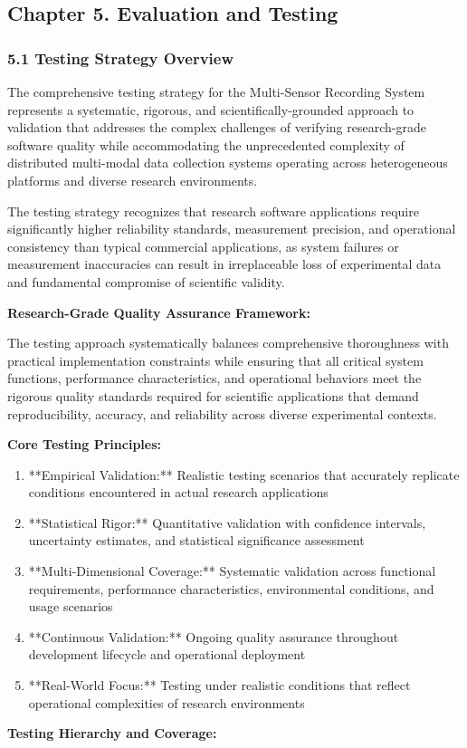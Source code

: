 \documentclass[12pt,a4paper]{report}
\begin{document}
\subsection{Chapter 5. Evaluation and Testing}

\subsubsection{5.1 Testing Strategy Overview}

The comprehensive testing strategy for the Multi-Sensor Recording System represents a systematic, rigorous, and
scientifically-grounded approach to validation that addresses the complex challenges of verifying research-grade
software quality while accommodating the unprecedented complexity of distributed multi-modal data collection systems
operating across heterogeneous platforms and diverse research environments.

The testing strategy recognizes that research software applications require significantly higher reliability standards,
measurement precision, and operational consistency than typical commercial applications, as system failures or
measurement inaccuracies can result in irreplaceable loss of experimental data and fundamental compromise of scientific
validity.

\textbf{Research-Grade Quality Assurance Framework:}

The testing approach systematically balances comprehensive thoroughness with practical implementation constraints while
ensuring that all critical system functions, performance characteristics, and operational behaviors meet the rigorous
quality standards required for scientific applications that demand reproducibility, accuracy, and reliability across
diverse experimental contexts.

\textbf{Core Testing Principles:}

\begin{enumerate}
\item **Empirical Validation:** Realistic testing scenarios that accurately replicate conditions encountered in actual
   research applications
\item **Statistical Rigor:** Quantitative validation with confidence intervals, uncertainty estimates, and statistical
   significance assessment
\item **Multi-Dimensional Coverage:** Systematic validation across functional requirements, performance characteristics,
   environmental conditions, and usage scenarios
\item **Continuous Validation:** Ongoing quality assurance throughout development lifecycle and operational deployment
\item **Real-World Focus:** Testing under realistic conditions that reflect operational complexities of research
   environments

\end{enumerate}
\textbf{Testing Hierarchy and Coverage:}
\end{document}
